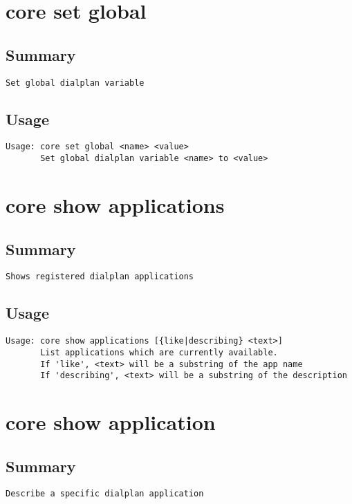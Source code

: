 \section{core set global}
\subsection{Summary}
\begin{verbatim}
Set global dialplan variable
\end{verbatim}
\subsection{Usage}
\begin{verbatim}
Usage: core set global <name> <value>
       Set global dialplan variable <name> to <value>

\end{verbatim}


\section{core show applications}
\subsection{Summary}
\begin{verbatim}
Shows registered dialplan applications
\end{verbatim}
\subsection{Usage}
\begin{verbatim}
Usage: core show applications [{like|describing} <text>]
       List applications which are currently available.
       If 'like', <text> will be a substring of the app name
       If 'describing', <text> will be a substring of the description

\end{verbatim}


\section{core show application}
\subsection{Summary}
\begin{verbatim}
Describe a specific dialplan application
\end{verbatim}
